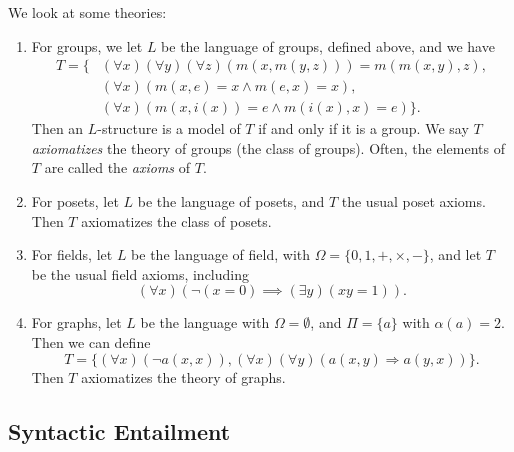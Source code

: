 \documentclass[12pt]{article}
\begin{document}
\begin{exbox}
	We look at some theories:
	\begin{enumerate}
		\item For groups, we let $L$ be the language of groups, defined above, and we have
			\begin{align*}
				T = \{&(\forall x)(\forall y)(\forall z) (m(x,m(y,z))) = m(m(x,y),z), \\
				      &(\forall x)(m(x,e) = x \wedge m(e,x) = x), \\
				      &(\forall x)(m(x,i(x)) = e \wedge m(i(x),x) = e)\}.
			\end{align*}
			Then an $L$-structure is a model of $T$ if and only if it is a group. We say $T$ \emph{axiomatizes} the theory of groups (the class of groups). Often, the elements of $T$ are called the \emph{axioms} of $T$.
		\item For posets, let $L$ be the language of posets, and $T$ the usual poset axioms. Then $T$ axiomatizes the class of posets.
		\item For fields, let $L$ be the language of field, with $\Omega = \{0, 1, +, \times, -\}$, and let $T$ be the usual field axioms, including
			\[
				(\forall x)(\neg(x = 0) \implies (\exists y)(xy = 1)).
			\]
		\item For graphs, let $L$ be the language with $\Omega = \emptyset$, and $\Pi = \{a\}$ with $\alpha(a) = 2$. Then we can define
			\[
				T = \{(\forall x)(\neg a(x,x)), (\forall x)(\forall y)(a(x,y) \Rightarrow a(y,x))\}.
			\]
			Then $T$ axiomatizes the theory of graphs.
	\end{enumerate}
\end{exbox}

\subsection{Syntactic Entailment}
\label{sub:syntactic_entailment}
\end{document}
